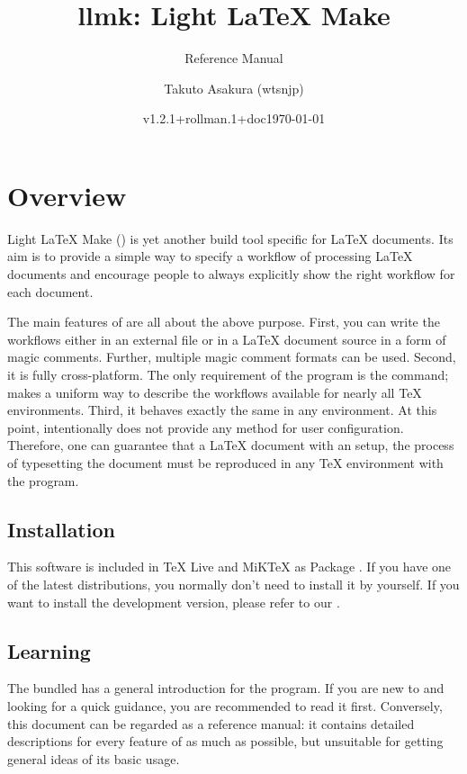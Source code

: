 \documentclass{llmk-doc}
\title{llmk: Light {\LaTeX} Make}
\author{Takuto Asakura (wtsnjp)}
\subtitle{Reference Manual}
\date{v1.2.1+rollman.1+doc\quad\today}
\begin{document}
\maketitle

\section{Overview}

Light {\LaTeX} Make () is yet another build tool specific for
{\LaTeX} documents. Its aim is to provide a simple way to specify a workflow of
processing {\LaTeX} documents and encourage people to always explicitly show
the right workflow for each document.

The main features of  are all about the above purpose. First, you
can write the workflows either in an external file  or in a
{\LaTeX} document source in a form of magic comments. Further, multiple magic
comment formats can be used. Second, it is fully cross-platform. The only
requirement of the program is the  command;  makes a
uniform way to describe the workflows available for nearly all {\TeX}
environments. Third, it behaves exactly the same in any environment. At this
point,  intentionally does not provide any method for user
configuration. Therefore, one can guarantee that a {\LaTeX} document with an
 setup, the process of typesetting the document must be reproduced
in any {\TeX} environment with the program.

\subsection{Installation}

This software is included in {\TeX} Live and MiK{\TeX} as Package
. If you have one of the latest distributions, you
normally don't need to install it by yourself. If you want to install the
development version, please refer to our {\README}.

\subsection{Learning }

The bundled {\README} has a general introduction for the program. If you are
new to  and looking for a quick guidance, you are recommended to
read it first. Conversely, this document can be regarded as a reference manual:
it contains detailed descriptions for every feature of  as much as
possible, but unsuitable for getting general ideas of its basic usage.
\end{document}

